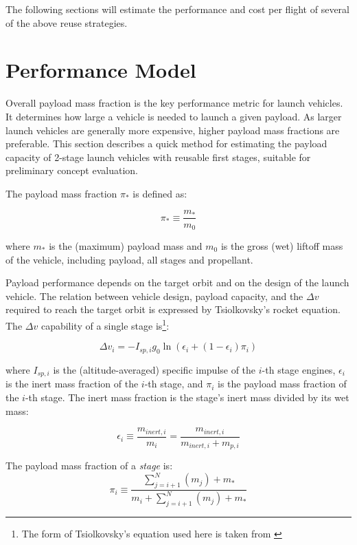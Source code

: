 \documentclass[conf]{new-aiaa}
\begin{document}
\begin{multicols}{2}
The following sections will estimate the performance and cost per flight of several of the above reuse strategies.

\section{Performance Model}

Overall payload mass fraction is the key performance metric for launch vehicles. It determines how large a vehicle is needed to launch a given payload. As larger launch vehicles are generally more expensive, higher payload mass fractions are preferable. This section describes a quick method for estimating the payload capacity of 2-stage launch vehicles with reusable first stages, suitable for preliminary concept evaluation.

The payload mass fraction $\pi_*$ is defined as:

\begin{equation}
\pi_* \equiv \frac{m_*}{m_0}
\end{equation}

where $m_*$ is the (maximum) payload mass and $m_0$ is the gross (wet) liftoff mass of the vehicle, including payload, all stages and propellant.

Payload performance depends on the target orbit and on the design of the launch vehicle. The relation between vehicle design, payload capacity, and the $\Delta v$ required to reach the target orbit is expressed by Tsiolkovsky’s rocket equation. The $\Delta v$ capability of a single stage is\footnote{The form of Tsiolkovsky's equation used here is taken from \cite{Wiesel2010}}:

\begin{equation}
\Delta v_i = - I_{sp,i} g_0 \ln \left( \epsilon_i + (1 - \epsilon_i) \pi_i \right)
\end{equation}

where $I_{sp,i}$ is the (altitude-averaged) specific impulse of the $i$-th stage engines, $\epsilon_i$ is the inert mass fraction of the $i$-th stage, and $\pi_i$ is the payload mass fraction of the $i$-th stage. The inert mass fraction is the stage's inert mass divided by its wet mass:

\begin{equation}
\epsilon_i \equiv \frac{m_{inert,i}}{m_i} = \frac{m_{inert,i}}{m_{inert,i} + m_{p,i}}
\end{equation}

The payload mass fraction of a \emph{stage} is:
\begin{equation}
\pi_i \equiv \frac{\sum_{j=i+1}^N (m_j) + m_*}{m_i + \sum_{j=i+1}^N (m_j) + m_*}
\end{equation}


\end{multicols}
\end{document}
